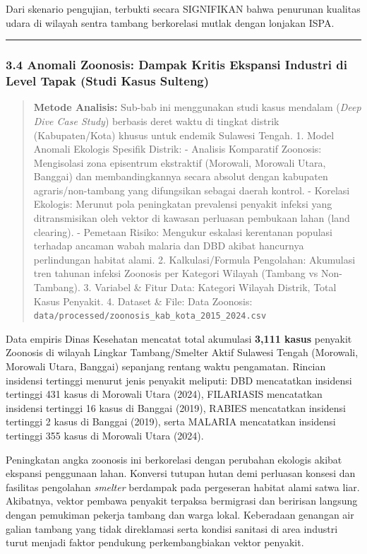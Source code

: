 \documentclass[
]{article}
\begin{document}
Dari skenario pengujian, terbukti secara SIGNIFIKAN bahwa penurunan
kualitas udara di wilayah sentra tambang berkorelasi mutlak dengan
lonjakan ISPA.

\begin{center}\rule{0.5\linewidth}{0.5pt}\end{center}

\subsubsection{3.4 Anomali Zoonosis: Dampak Kritis Ekspansi Industri di
Level Tapak (Studi Kasus
Sulteng)}\label{anomali-zoonosis-dampak-kritis-ekspansi-industri-di-level-tapak-studi-kasus-sulteng}

\begin{quote}
\textbf{Metode Analisis:} Sub-bab ini menggunakan studi kasus mendalam
(\emph{Deep Dive Case Study}) berbasis deret waktu di tingkat distrik
(Kabupaten/Kota) khusus untuk endemik Sulawesi Tengah. 1. Model Anomali
Ekologis Spesifik Distrik: - Analisis Komparatif Zoonosis: Mengisolasi
zona episentrum ekstraktif (Morowali, Morowali Utara, Banggai) dan
membandingkannya secara absolut dengan kabupaten agraris/non-tambang
yang difungsikan sebagai daerah kontrol. - Korelasi Ekologis: Merunut
pola peningkatan prevalensi penyakit infeksi yang ditransmisikan oleh
vektor di kawasan perluasan pembukaan lahan (land clearing). - Pemetaan
Risiko: Mengukur eskalasi kerentanan populasi terhadap ancaman wabah
malaria dan DBD akibat hancurnya perlindungan habitat alami. 2.
Kalkulasi/Formula Pengolahan: Akumulasi tren tahunan infeksi Zoonosis
per Kategori Wilayah (Tambang vs Non-Tambang). 3. Variabel \& Fitur
Data: Kategori Wilayah Distrik, Total Kasus Penyakit. 4. Dataset \&
File: Data Zoonosis:
\texttt{data/processed/zoonosis\_kab\_kota\_2015\_2024.csv}
\end{quote}

Data empiris Dinas Kesehatan mencatat total akumulasi \textbf{3,111
kasus} penyakit Zoonosis di wilayah Lingkar Tambang/Smelter Aktif
Sulawesi Tengah (Morowali, Morowali Utara, Banggai) sepanjang rentang
waktu pengamatan. Rincian insidensi tertinggi menurut jenis penyakit
meliputi: DBD mencatatkan insidensi tertinggi 431 kasus di Morowali
Utara (2024), FILARIASIS mencatatkan insidensi tertinggi 16 kasus di
Banggai (2019), RABIES mencatatkan insidensi tertinggi 2 kasus di
Banggai (2019), serta MALARIA mencatatkan insidensi tertinggi 355 kasus
di Morowali Utara (2024).

Peningkatan angka zoonosis ini berkorelasi dengan perubahan ekologis
akibat ekspansi penggunaan lahan. Konversi tutupan hutan demi perluasan
konsesi dan fasilitas pengolahan \emph{smelter} berdampak pada
pergeseran habitat alami satwa liar. Akibatnya, vektor pembawa penyakit
terpaksa bermigrasi dan beririsan langsung dengan pemukiman pekerja
tambang dan warga lokal. Keberadaan genangan air galian tambang yang
tidak direklamasi serta kondisi sanitasi di area industri turut menjadi
faktor pendukung perkembangbiakan vektor penyakit.
\end{document}
